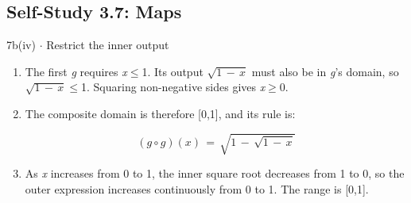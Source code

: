 \documentclass[11pt]{article}
\begin{document}
\begin{keepsection}\subsection{Self-Study 3.7: Maps}

\begin{workedbox}{7b(iv) \ensuremath{\cdot} Restrict the inner output}
\begin{enumerate}
\item The first \textit{g} requires \textit{x}\ensuremath{\leq}1. Its output \ensuremath{\sqrt{1\, -\, {x}}} must also be in \textit{g}’s domain, so \ensuremath{\sqrt{1\, -\, {x}}}\ensuremath{\leq}1. Squaring non-negative sides gives \textit{x}\ensuremath{\geq}0.
\item {}
The composite domain is therefore [0,1], and its rule is:

\begin{equation*}({g}\circ {g})({x})\, =\, \sqrt{1\, -\, \sqrt{1\, -\, {x}}}\end{equation*}
\item As \textit{x} increases from 0 to 1, the inner square root decreases from 1 to 0, so the outer expression increases continuously from 0 to 1. The range is [0,1].
\end{enumerate}
\end{workedbox}

\end{keepsection}
\end{document}
